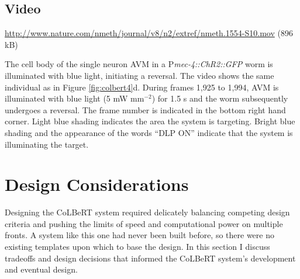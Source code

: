 \subsection{Video}\label{movie:colbert9} %
\url{http://www.nature.com/nmeth/journal/v8/n2/extref/nmeth.1554-S10.mov} (896 kB)

The cell body of the single neuron AVM in a P\textit{mec-4::ChR2::GFP} worm is illuminated with blue light, initiating a reversal. The video shows the same individual as in Figure \ref{fig:colbert4}d. During frames 1,925 to 1,994, AVM is illuminated with blue light (5 mW mm$^{−2}$) for 1.5 s and the worm subsequently undergoes a reversal. The frame number is indicated in the bottom right hand corner. Light blue shading indicates the area the system is targeting. Bright blue shading and the appearance of the words “DLP ON” indicate that the system is illuminating the target.


\section{Design Considerations}
Designing the CoLBeRT system required delicately balancing competing design criteria and pushing the limits of speed and computational power on multiple fronts. A system like this one had never been built before, so there were no existing templates upon which to base the design.  In this section I discuss tradeoffs and design decisions that informed the CoLBeRT system's development and eventual design.

